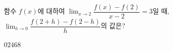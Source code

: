 함수 $f(x)$에 대하여 $\displaystyle\lim_{x\to 2}\dfrac{f(x)-f(2)}{x-2}=3$일 때, $\displaystyle\lim_{h\to 0}\dfrac{f(2+h)-f(2-h)}{h}$의 값은?
\begin{choices32}{$0$}{$2$}{$4$}{$6$}{$8$}\end{choices32}
